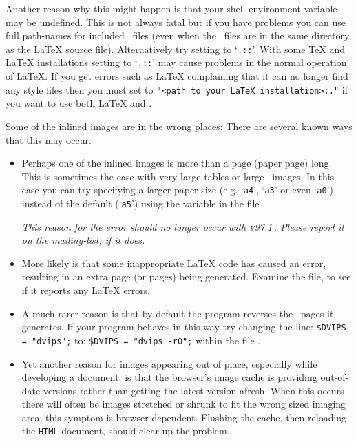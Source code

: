 \begin{htmllist}
Another reason why this might happen is that your shell environment variable 
 may be undefined. This is not always 
fatal but if you have problems you can use full
path-names for included \PS\ files (even when the \PS\
files are in the same directory as the \LaTeX{} source file).
Alternatively try setting  to `\texttt{.::}'. 
With some \TeX{} and \LaTeX{} installations setting  to 
`\texttt{.::}' may cause problems in the normal operation of \LaTeX.
If you get errors such as \LaTeX{} complaining that it can no longer find
any style files then you must set \fn{TEXINPUTS} to 
\verb|"<path to your LaTeX installation>:."|
if you want to use both \LaTeX{} and \latextohtml{}.

\item [Some of the inlined images are in the wrong places: ]
There are several known ways that this may occur.
\begin{itemize}
\item
Perhaps one of the inlined images is more than a page (paper page) long. 
This is sometimes the case with very large tables
or large \PS\ images. In this case you can try specifying 
a larger paper size (e.g. `\texttt{a4}', `\texttt{a3}' or even `\texttt{a0}') 
instead of the default (`\texttt{a5}') 
using the \latextohtml{} variable  
in the file .

\smallskip\noindent
\textit{This reason for the error should no longer occur with \textsc{v97.1}\,.
Please report it on the mailing-list, if it does.}

\item
More likely is that some inappropriate \LaTeX{} code 
has caused an error, resulting in an extra page (or pages) being generated.
Examine the \fn{images.log} file, to see if it reports any \LaTeX{} errors.

\item
A much rarer reason is that by default the  program
reverses the \PS\ pages it generates. If your \fn{dvips} program
behaves in this way try changing the line: \html{\\}
\verb|$DVIPS = "dvips";| \html{\\}
to: \html{\\}
\verb|$DVIPS = "dvips -r0";| \html{\\}
within the file .

\item
Yet another reason for images appearing out of place, especially while
developing a document, is that the browser's image cache is providing
out-of-date versions rather than getting the latest version afresh.
When this occurs there will often be images stretched or shrunk
to fit the wrong sized imaging area; this symptom is browser-dependent.
Flushing the cache, then reloading the \texttt{HTML} document, should
clear up the problem. 
\end{itemize}



\end{htmllist}
